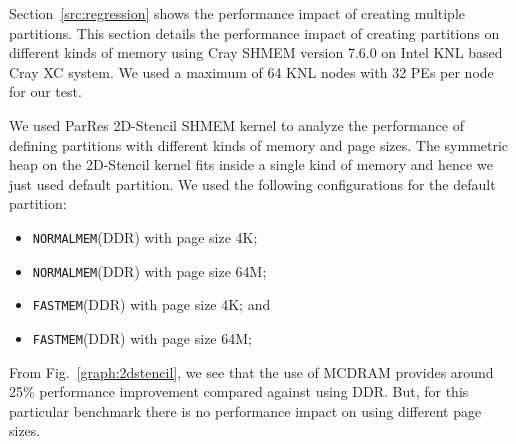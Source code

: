 Section~\ref{src:regression} shows the performance impact of
creating multiple partitions. This section details the performance
impact of creating partitions on different kinds of memory using
Cray SHMEM version 7.6.0 on Intel KNL based Cray XC system. We used
a maximum of 64 KNL nodes with 32 PEs per node for our test.

We used ParRes 2D-Stencil SHMEM kernel to analyze the performance
of defining partitions with different kinds of memory and
page sizes. The symmetric heap on the 2D-Stencil kernel fits inside
a single kind of memory and hence we just used default partition. We
used the following configurations for the default partition:
\begin{itemize}
    \item \texttt{NORMALMEM}(DDR) with page size 4K;
    \item \texttt{NORMALMEM}(DDR) with page size 64M;
    \item \texttt{FASTMEM}(DDR) with page size 4K; and
    \item \texttt{FASTMEM}(DDR) with page size 64M;
\end{itemize}
From Fig.~\ref{graph:2dstencil}, we see that the use of MCDRAM
provides around 25\% performance improvement compared against
using DDR. But, for this particular benchmark there is no performance
impact on using different page sizes.



